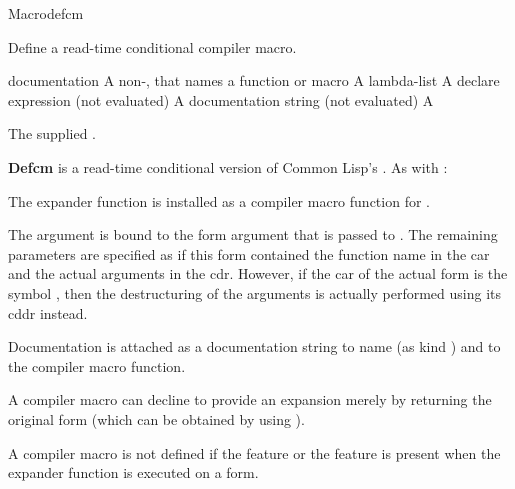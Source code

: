 \documentclass[10pt,twoside,english,pdftex]{article}
\begin{document}
\begin{functiondoc}{Macro}{defcm}{
    }
%
%

\fnsyntax

\fnpurpose Define a read-time conditional compiler macro.

\fnpackage {}

\fnmodule {}

\fnargs
\begin{args}{documentation}
\arg[name] A non-\nil,  that names a function or macro
 A lambda-list
\arg[declaration] A declare expression (not evaluated)
\arg[documentation] A documentation string (not evaluated)
\arg[form] A 
\end{args}

\fnreturns The supplied .

\fndescription 
%
\textbf{Defcm} is a read-time conditional version of Common Lisp's
.  As with
:
%
\begin{tightitemize}
\item The expander function is installed as a compiler macro function for
  .
\item The  argument is bound to the form argument that is passed
  to . The remaining 
  parameters are specified as if this form contained the function name in the
  car and the actual arguments in the cdr.  However, if the car of the actual
  form is the symbol , then the destructuring of the
  arguments is actually performed using its cddr instead.
\item Documentation is attached as a documentation string to name (as kind
  ) and to the compiler macro function.
\item A compiler macro can decline to provide an expansion merely by returning
  the original form (which can be obtained by using ).
\end{tightitemize}
%
A compiler macro is not defined if the feature
 or the feature
 is present when the expander
function is executed on a form.


\end{functiondoc}
\end{document}

